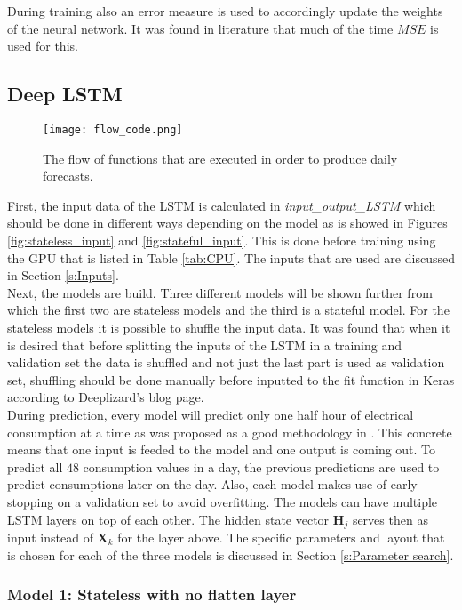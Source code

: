During training also an error measure is used to accordingly update the weights of the neural network. It was found in literature that much of the time $ MSE $ is used for this.


\subsection{Deep LSTM}\label{s:LSTM_implementation}
\begin{figure}[ht]
	\centering
	\texttt{[image: flow\_code.png]}
	\caption{The flow of functions that are executed in order to produce daily forecasts.}
	\label{fig:model1}
\end{figure}


First, the input data of the LSTM is calculated in \textit{input\_output\_LSTM} which should be done in different ways depending on the model as is showed in Figures \ref{fig:stateless_input} and \ref{fig:stateful_input}. This is done before training using the GPU that is listed in Table \ref{tab:CPU}. The inputs that are used are discussed in Section \ref{s:Inputs}. \\ 
Next, the models are build. Three different models will be shown further from which the first two are stateless models and the third is a stateful model. For the stateless models it is possible to shuffle the input data. It was found that when it is desired that before splitting the inputs of the LSTM in a training and validation set the data is shuffled and not just the last part is used as validation set, shuffling should be done manually before inputted to the fit function in Keras according to Deeplizard's blog page.\\
During prediction, every model will predict only one half hour of electrical consumption at a time as was proposed as a good methodology in \cite{ANNRNN}. This concrete means that one input is feeded to the model and one output is coming out. To predict all $ 48 $ consumption values in a day, the previous predictions are used to predict consumptions later on the day. Also, each model makes use of early stopping on a validation set to avoid overfitting. The models can have multiple LSTM layers on top of each other. The hidden state vector $ \bm{H}_{j} $ serves then as input instead of $ \bm{X}_{k} $ for the layer above. The specific parameters and layout that is chosen for each of the three models is discussed in Section \ref{s:Parameter search}.

\subsubsection{Model 1: Stateless with no flatten layer}\label{s:Model1}

